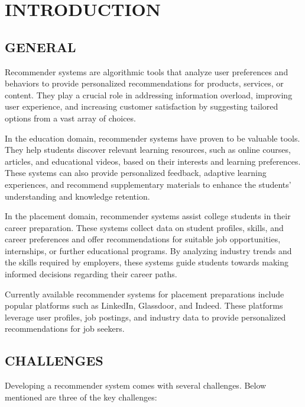 \chapter{\uppercase{Introduction}} %
\label{ch:intro} %

\section{\uppercase{General}}
Recommender systems are algorithmic tools that analyze user preferences and
behaviors to provide personalized recommendations for products, services, or
content. They play a crucial role in addressing information overload, improving
user experience, and increasing customer satisfaction by suggesting tailored options
from a vast array of choices.

In the education domain, recommender systems have proven to be valuable tools. They
help students discover relevant learning resources, such as online courses, articles,
and educational videos, based on their interests and learning preferences. These
systems can also provide personalized feedback, adaptive learning experiences,
and recommend supplementary materials to enhance the students’ understanding and
knowledge retention.

In the placement domain, recommender systems assist college students in their career
preparation. These systems collect data on student profiles, skills, and career
preferences and offer recommendations for suitable job opportunities, internships,
or further educational programs. By analyzing industry trends and the skills required
by employers, these systems guide students towards making informed decisions
regarding their career paths.

Currently available recommender systems for placement preparations include
popular platforms such as LinkedIn, Glassdoor, and Indeed. These platforms leverage
user profiles, job postings, and industry data to provide personalized recommendations
for job seekers.

\section{\uppercase{Challenges}}
Developing a recommender system comes with several challenges. Below mentioned
are three of the key challenges:

